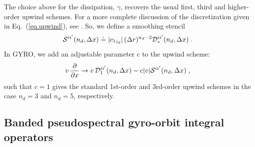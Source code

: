 \noindent
The choice above for the dissipation, $\gamma$, recovers the usual 
first, third and higher-order upwind schemes.  For a more complete 
discussion of the discretization given in Eq.~(\ref{eq.upwind}),
see \cite{candy:2003}.  So, we define a smoothing stencil
%
\begin{equation}
{\cal S}^{ii^\prime}(n_d,\Delta x) \doteq 
| {c_1}_{i_d} | \, (\Delta r)^{n_d-2} 
{\cal D}_*^{ii^\prime}(n_d,\Delta x) \; .
\end{equation}
%
In GYRO, we add an adjustable parameter $c$ to the upwind scheme:
%
\begin{equation}
v \, \frac{\partial}{\partial x} \rightarrow 
v \, {\cal D}_1^{i{i^\prime}}(n_d,\Delta x) 
- c |v| {\cal S}^{i{i^\prime}}(n_d,\Delta x) \; ,
\label{eq.gupwind}
\end{equation}
%
such that $c=1$ gives the standard 1st-order and 3rd-order upwind
schemes in the case $n_d=3$ and $n_d=5$, respectively.

\subsection{Banded pseudospectral gyro-orbit integral operators}

